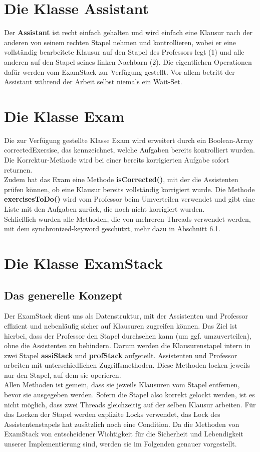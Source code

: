 \documentclass[12pt,a4paper]{article}
\begin{document}
\newpage
\section{Die Klasse Assistant}

Der \textbf{Assistant} ist recht einfach gehalten und wird einfach eine Klausur nach der anderen von seinem rechten Stapel nehmen und kontrollieren, wobei er eine vollständig bearbeitete Klausur auf den Stapel des Professors legt (1) und alle anderen auf den Stapel seines linken Nachbarn (2). Die eigentlichen Operationen dafür werden vom ExamStack zur Verfügung gestellt. Vor allem betritt der Assistant während der Arbeit selbst niemals ein Wait-Set.

\newpage
\section{Die Klasse Exam}

Die zur Verfügung gestellte Klasse Exam wird erweitert durch ein Boolean-Array correctedExersise, das kennzeichnet, welche Aufgaben bereits kontrolliert wurden. Die Korrektur-Methode wird bei einer bereits korrigierten Aufgabe sofort returnen.\\ Zudem hat das Exam eine Methode \textbf{isCorrected()}, mit der die Assistenten prüfen können, ob eine Klausur bereits vollständig korrigiert wurde. Die Methode \textbf{exercisesToDo()} wird vom Professor beim Umverteilen verwendet und gibt eine Liste mit den Aufgaben zurück, die noch nicht korrigiert wurden.\\
Schließlich wurden alle Methoden, die von mehreren Threads verwendet werden, mit dem synchronized-keyword geschützt, mehr dazu in Abschnitt 6.1.


\newpage
\section{Die Klasse ExamStack}
\subsection{Das generelle Konzept}
Der ExamStack dient uns als Datenstruktur, mit der Assistenten und Professor effizient und nebenläufig sicher auf Klausuren zugreifen können. Das Ziel ist hierbei, dass der Professor den Stapel durchsehen kann (um ggf. umzuverteilen), ohne die Assistenten zu behindern. Darum werden die Klausurenstapel intern in zwei Stapel \textbf{assiStack} und \textbf{profStack} aufgeteilt. Assistenten und Professor arbeiten mit unterschiedlichen Zugriffsmethoden. Diese Methoden locken jeweils nur den Stapel, auf dem sie operieren.\\
Allen Methoden ist gemein, dass sie jeweils Klausuren vom Stapel entfernen, bevor sie ausgegeben werden. Sofern die Stapel also korrekt gelockt werden, ist es nicht möglich, dass zwei Threads gleichzeitig auf der selben Klausur arbeiten. Für das Locken der Stapel werden explizite Locks verwendet, das Lock des Assistentenstapels hat zusätzlich noch eine Condition.
Da die Methoden von ExamStack von entscheidener Wichtigkeit für die Sicherheit und Lebendigkeit unserer Implementierung sind, werden sie im Folgenden genauer vorgestellt.
\end{document}
